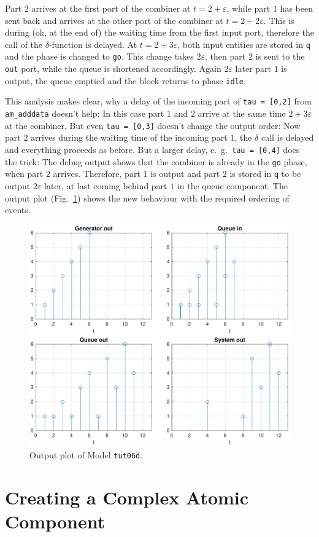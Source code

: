 \documentclass[12pt,oneside,a4paper,bibtotoc,BCOR=0pt,DIV=20]{scrreprt}
\newcommand{\cft}[1]{\mbox{\texttt{#1}}}   %
\newcommand{\epsi}{\varepsilon}
\begin{document}
Part $2$ arrives at the first port of the combiner at $t = 2 + \epsi$, while
part $1$ has been sent back and arrives at the other port of the combiner at $t
= 2 + 2\epsi$. This is during (ok, at the end of) the waiting time from the
first input port, therefore the call of the $\delta$-function is delayed. At $t
= 2 + 3\epsi$, both input entities are stored in \cft{q} and the phase is
changed to \cft{go}. This change takes $2\epsi$, then part $2$ is sent to the
\cft{out} port, while the queue is shortened accordingly. Again $2\epsi$ later
part $1$ is output, the queue emptied and the block returns to phase
\cft{idle}.

This analysis makes clear, why a delay of the incoming part of \cft{tau =
  [0,2]} from \cft{am\_adddata} doesn't help: In this case part $1$ and $2$
arrive at the same time $2 + 3\epsi$ at the combiner. But even \cft{tau =
  [0,3]} doesn't change the output order: Now part $2$ arrives during the
waiting time of the incoming part $1$, the $\delta$ call is delayed and
everything proceeds as before. But a larger delay, e.\ g.\ \cft{tau = [0,4]}
does the trick: The debug output shows that the combiner is already in the
\cft{go} phase, when part $2$ arrives. Therefore, part $1$ is output and part
$2$ is stored in \cft{q} to be output $2\epsi$ later, at last coming behind
part $1$ in the queue component.  The output plot (Fig.\ \ref{fig_18}) shows
the new behaviour with the required ordering of events.

\begin{figure}[ht]
\centering
\includegraphics[width=0.48\columnwidth]{images/bild18.pdf}
\caption{Output plot of Model \cft{tut06d}.}
\label{fig_18}
\end{figure}


\chapter{Creating a Complex Atomic Component} \label{sec9}
\end{document}
